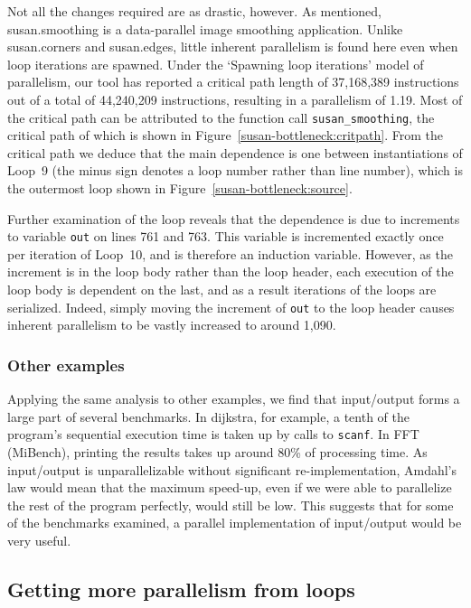 Not all the changes required are as drastic, however.
As mentioned, \textsf{susan.smoothing} is a data-parallel image smoothing application.
Unlike \textsf{susan.corners} and \textsf{susan.edges}, little inherent parallelism is found here even when loop iterations are spawned.
Under the `Spawning loop iterations' model of parallelism, our tool has reported a critical path length of 37,168,389 instructions out of a total of 44,240,209 instructions, resulting in a parallelism of 1.19.
Most of the critical path can be attributed to the function call \texttt{susan\_smoothing}, the critical path of which is shown in Figure~\ref{susan-bottleneck:critpath}.
From the critical path we deduce that the main dependence is one between instantiations of Loop~9 (the minus sign denotes a loop number rather than line number), which is the outermost loop shown in Figure~\ref{susan-bottleneck:source}.

Further examination of the loop reveals that the dependence is due to increments to variable \texttt{out} on lines 761 and 763.
This variable is incremented exactly once per iteration of Loop~10, and is therefore an induction variable.
However, as the increment is in the loop body rather than the loop header, each execution of the loop body is dependent on the last, and as a result iterations of the loops are serialized.
Indeed, simply moving the increment of \texttt{out} to the loop header causes inherent parallelism to be vastly increased to around 1,090.

\subsubsection{Other examples}

Applying the same analysis to other examples, we find that input/output forms a large part of several benchmarks.
In \textsf{dijkstra}, for example, a tenth of the program's sequential execution time is taken up by calls to \texttt{scanf}.
In \textsf{FFT} (MiBench), printing the results takes up around 80\% of processing time.
As input/output is unparallelizable without significant re-implementation, Amdahl's law would mean that the maximum speed-up, even if we were able to parallelize the rest of the program perfectly, would still be low.
This suggests that for some of the benchmarks examined, a parallel implementation of input/output would be very useful.

\subsection{Getting more parallelism from loops}

